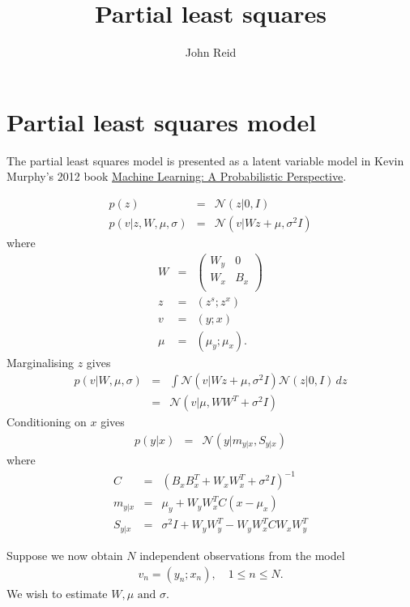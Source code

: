 \documentclass{article}
\title{Partial least squares}
\author{John Reid}
\begin{document}
\section{Partial least squares model}

The partial least
squares model is presented as a latent variable model in Kevin Murphy's 2012
book \href{https://probml.github.io/pml-book/}{Machine Learning: A
Probabilistic Perspective}.

\begin{eqnarray}
  p(z) &=& \mathcal{N}(z|0, I) \\
  p(v|z, W, \mu, \sigma) &=& \mathcal{N}(v|W z + \mu, \sigma^2 I)
\end{eqnarray}
where
\begin{eqnarray}
  W &=& \begin{pmatrix}
      W_y & 0 \\
      W_x & B_x \\
    \end{pmatrix} \\
  z &=& (z^s; z^x) \\
  v &=& (y; x) \\
  \mu &=& (\mu_y; \mu_x).
\end{eqnarray}
Marginalising $z$ gives
\begin{eqnarray}
  p(v|W, \mu, \sigma)
  &=& \int \mathcal{N}(v|W z + \mu, \sigma^2 I) \mathcal{N}(z|0, I)\,dz \\
  &=& \mathcal{N}(v|\mu, W W^T + \sigma^2 I)
\end{eqnarray}
Conditioning on $x$ gives
\begin{eqnarray}
  p(y|x) &=& \mathcal{N}(y|m_{y|x}, S_{y|x})
\end{eqnarray}
where
\begin{eqnarray}
  C &=& {(B_x B_x^T + W_x W_x^T + \sigma^2 I)}^{-1} \\
  m_{y|x} &=& \mu_y + W_y W_x^T C (x - \mu_x) \\
  S_{y|x} &=& \sigma^2 I + W_y W_y^T - W_y W_x^T C W_x W_y^T
\end{eqnarray}

Suppose we now obtain $N$ independent observations from the model
\begin{eqnarray}
  v_n = (y_n; x_n),\quad 1 \le n \le N.
\end{eqnarray}
We wish to estimate $W, \mu \text{ and } \sigma$.
\end{document}
